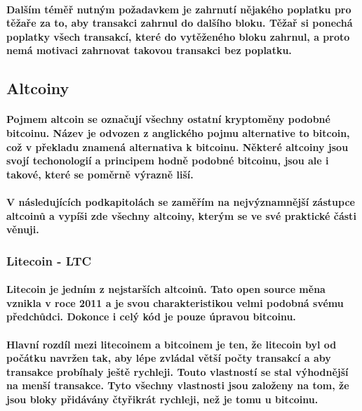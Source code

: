 \documentclass[thesis=B,czech]{FITthesis}[2019/03/21]
\begin{document}
\paragraph{
Dalším téměř nutným požadavkem je zahrnutí nějakého poplatku pro těžaře za to, aby transakci zahrnul do dalšího bloku. Těžař si ponechá poplatky všech transakcí, které do vytěženého bloku zahrnul, a proto nemá motivaci zahrnovat takovou transakci bez poplatku. \cite{Finex_blockchain}
}

\subsection{Altcoiny}
\paragraph{
Pojmem altcoin se označují všechny ostatní kryptoměny podobné bitcoinu. Název je odvozen z anglického pojmu alternative to bitcoin, což v překladu znamená alternativa k bitcoinu. Některé altcoiny jsou svojí techonologií a principem hodně podobné bitcoinu, jsou ale i takové, které se poměrně výrazně liší. \cite{altcoin}
}
\paragraph{
V následujících podkapitolách se zaměřím na nejvýznamnější zástupce altcoinů a vypíši zde všechny altcoiny, kterým se ve své praktické části věnuji.
}
\subsubsection{Litecoin - LTC}
\paragraph{
Litecoin je jedním z nejstarších altcoinů. Tato open source měna vznikla v roce 2011 a je svou charakteristikou velmi podobná svému předchůdci. \cite{litecoin} Dokonce i celý kód je pouze úpravou bitcoinu. \cite{alza_monero}
}
\paragraph{
Hlavní rozdíl mezi litecoinem a bitcoinem je ten, že litecoin byl od počátku navržen tak, aby lépe zvládal větší počty transakcí a aby transakce probíhaly ještě rychleji. Touto vlastností se stal výhodnější na menší transakce. Tyto všechny vlastnosti jsou založeny na tom, že jsou bloky přidávány čtyřikrát rychleji, než je tomu u bitcoinu. \cite{litecoin}
}
\end{document}
